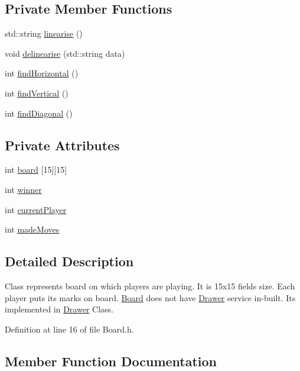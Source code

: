 \subsection*{Private Member Functions}
\begin{DoxyCompactItemize}
\item 
std\+::string \hyperlink{classBoard_a17ee7e0130537721b492cb7ed7235974}{linearise} ()
\item 
void \hyperlink{classBoard_a58de3d2bd69db7ef9258b3b907eb9de8}{delinearise} (std\+::string data)
\item 
int \hyperlink{classBoard_a2f984f83124db1b1df386ef9deff6a24}{find\+Horizontal} ()
\item 
int \hyperlink{classBoard_a4ee8b912055e8705e37a9b37125b70f0}{find\+Vertical} ()
\item 
int \hyperlink{classBoard_a99cff26f921e228dc11c381747381ced}{find\+Diagonal} ()
\end{DoxyCompactItemize}
\subsection*{Private Attributes}
\begin{DoxyCompactItemize}
\item 
int \hyperlink{classBoard_af588c465a63e9447a674398ec44446a9}{board} \mbox{[}15\mbox{]}\mbox{[}15\mbox{]}
\item 
int \hyperlink{classBoard_a67eeec840d17ab997e32234493ac7e39}{winner}
\item 
int \hyperlink{classBoard_a86b952cc745c2bd392f74434653457d3}{current\+Player}
\item 
int \hyperlink{classBoard_abfd418c2974974039da3fff24ad5c185}{made\+Moves}
\end{DoxyCompactItemize}


\subsection{Detailed Description}
Class represents board on which players are playing. It is 15x15 fields size. Each player puts its marks on board. \hyperlink{classBoard}{Board} does not have \hyperlink{classDrawer}{Drawer} service in-\/built. It\textquotesingle{}s implemented in \hyperlink{classDrawer}{Drawer} Class. 

Definition at line 16 of file Board.\+h.



\subsection{Member Function Documentation}
\mbox{\label{classBoard_a58de3d2bd69db7ef9258b3b907eb9de8}} 
